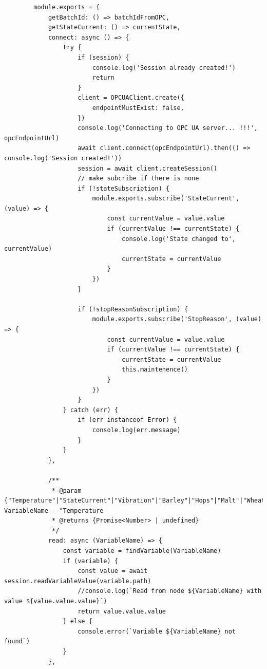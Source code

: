 \begin{center}
\begin{verbatim}
        module.exports = {
            getBatchId: () => batchIdFromOPC,
            getStateCurrent: () => currentState,
            connect: async () => {
                try {
                    if (session) {
                        console.log('Session already created!')
                        return
                    }
                    client = OPCUAClient.create({
                        endpointMustExist: false,
                    })
                    console.log('Connecting to OPC UA server... !!!', opcEndpointUrl)
                    await client.connect(opcEndpointUrl).then(() => console.log('Session created!'))
                    session = await client.createSession()
                    // make subcribe if there is none
                    if (!stateSubscription) {
                        module.exports.subscribe('StateCurrent', (value) => {
                            const currentValue = value.value
                            if (currentValue !== currentState) {
                                console.log('State changed to', currentValue)
                                currentState = currentValue
                            }
                        })
                    }

                    if (!stopReasonSubscription) {
                        module.exports.subscribe('StopReason', (value) => {
                            const currentValue = value.value
                            if (currentValue !== currentState) {
                                currentState = currentValue
                                this.maintenence()
                            }
                        })
                    }
                } catch (err) {
                    if (err instanceof Error) {
                        console.log(err.message)
                    }
                }
            },

            /**
             * @param {"Temperature"|"StateCurrent"|"Vibration"|"Barley"|"Hops"|"Malt"|"Wheat"|"Yeast"|"FillingInventory"|"Counter"|"State"|"StopReason"|"ExecuteState"|"ExecuteOrder"|"BeerType"|"BeerAmount"|"MachineSpeed"|"BatchId"|"SetBatchId"} VariableName - "Temperature
             * @returns {Promise<Number> | undefined}
             */
            read: async (VariableName) => {
                const variable = findVariable(VariableName)
                if (variable) {
                    const value = await session.readVariableValue(variable.path)
                    //console.log(`Read from node ${VariableName} with value ${value.value.value}`)
                    return value.value.value
                } else {
                    console.error(`Variable ${VariableName} not found`)
                }
            },


\end{verbatim}
\end{center}
